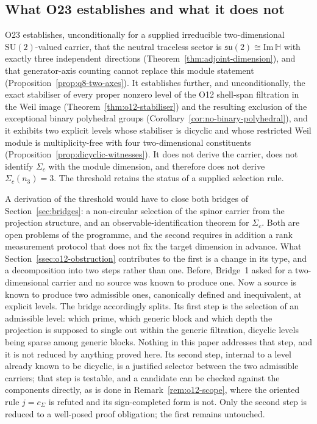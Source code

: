 \documentclass[11pt,a4paper]{article}
\newcommand{\ImH}{\mathrm{Im}\,\mathbb{H}}
\newcommand{\su}{\mathfrak{su}}
\newcommand{\SU}{\mathrm{SU}}
\begin{document}
  \subsection{What O23 establishes and what it does not}
    \label{ssec:scope-discussion}

    O23 establishes, unconditionally for a supplied irreducible two-dimensional
    $\SU(2)$-valued carrier, that the neutral traceless sector is $\su(2) \cong \ImH$ with exactly three
    independent directions (Theorem~\ref{thm:adjoint-dimension}), and that generator-axis
    counting cannot replace this module statement
    (Proposition~\ref{prop:q8-two-axes}).
    It establishes further, and unconditionally, the exact stabiliser of every proper nonzero
    level of the O12 shell-span filtration in the Weil image
    (Theorem~\ref{thm:o12-stabiliser}) and the resulting exclusion of the exceptional binary
    polyhedral groups (Corollary~\ref{cor:no-binary-polyhedral}), and it exhibits two explicit
    levels whose stabiliser is dicyclic and whose restricted Weil module is multiplicity-free
    with four two-dimensional constituents (Proposition~\ref{prop:dicyclic-witnesses}).
    It does not derive the carrier, does not identify $\Sigma_{c}$ with the module
    dimension, and therefore does not derive $\Sigma_{c}(n_{3}) = 3$.
    The threshold retains the status of a supplied selection rule.

    A derivation of the threshold would have to close both bridges of
    Section~\ref{sec:bridges}: a non-circular selection of the spinor carrier from the
    projection structure, and an observable-identification theorem for $\Sigma_{c}$.
    Both are open problems of the programme, and the second requires in addition a rank
    measurement protocol that does not fix the target dimension in advance.
    What Section~\ref{ssec:o12-obstruction} contributes to the first is a change in its type,
    and a decomposition into two steps rather than one.
    Before, Bridge~1 asked for a two-dimensional carrier and no source was known to produce one.
    Now a source is known to produce two admissible ones, canonically defined and inequivalent,
    at explicit levels.
    The bridge accordingly splits.
    Its first step is the selection of an admissible level: which prime, which generic block and
    which depth the projection is supposed to single out within the generic filtration, dicyclic
    levels being sparse among generic blocks.
    Nothing in this paper addresses that step, and it is not reduced by anything proved here.
    Its second step, internal to a level already known to be dicyclic, is a justified selector
    between the two admissible carriers; that step is testable, and a candidate can be checked
    against the components directly, as is done in Remark~\ref{rem:o12-scope}, where the
    oriented rule $j = c_{\Sigma}$ is refuted and its sign-completed form is not.
    Only the second step is reduced to a well-posed proof obligation; the first remains
    untouched.
\end{document}
